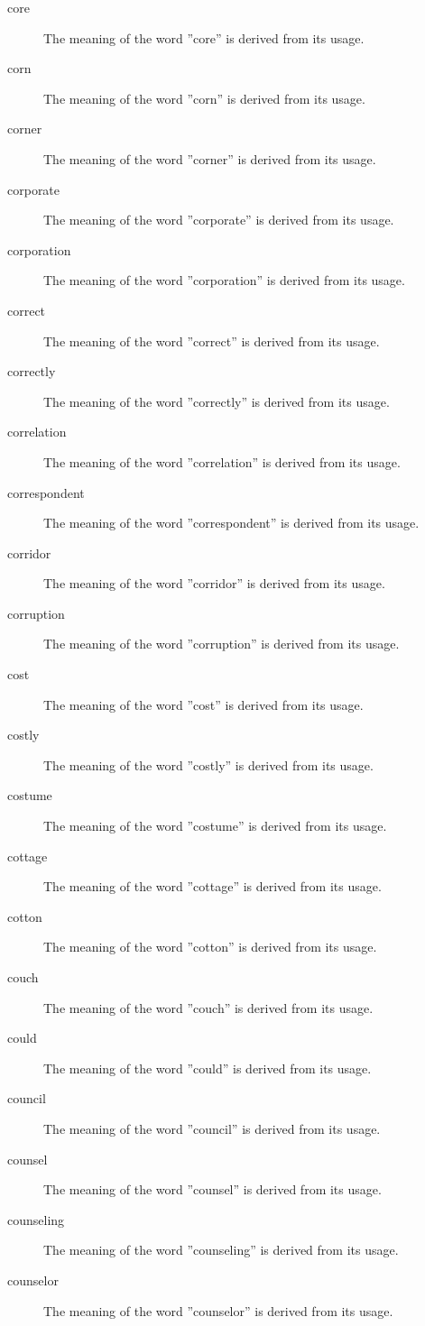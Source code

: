 \documentclass[12pt, letterpaper]{memoir}
\begin{document}
\begin{description}
\item[core] The meaning of the word ''core'' is derived from its usage.
\item[corn] The meaning of the word ''corn'' is derived from its usage.
\item[corner] The meaning of the word ''corner'' is derived from its usage.
\item[corporate] The meaning of the word ''corporate'' is derived from its usage.
\item[corporation] The meaning of the word ''corporation'' is derived from its usage.
\item[correct] The meaning of the word ''correct'' is derived from its usage.
\item[correctly] The meaning of the word ''correctly'' is derived from its usage.
\item[correlation] The meaning of the word ''correlation'' is derived from its usage.
\item[correspondent] The meaning of the word ''correspondent'' is derived from its usage.
\item[corridor] The meaning of the word ''corridor'' is derived from its usage.
\item[corruption] The meaning of the word ''corruption'' is derived from its usage.
\item[cost] The meaning of the word ''cost'' is derived from its usage.
\item[costly] The meaning of the word ''costly'' is derived from its usage.
\item[costume] The meaning of the word ''costume'' is derived from its usage.
\item[cottage] The meaning of the word ''cottage'' is derived from its usage.
\item[cotton] The meaning of the word ''cotton'' is derived from its usage.
\item[couch] The meaning of the word ''couch'' is derived from its usage.
\item[could] The meaning of the word ''could'' is derived from its usage.
\item[council] The meaning of the word ''council'' is derived from its usage.
\item[counsel] The meaning of the word ''counsel'' is derived from its usage.
\item[counseling] The meaning of the word ''counseling'' is derived from its usage.
\item[counselor] The meaning of the word ''counselor'' is derived from its usage.

\end{description}
\end{document}
